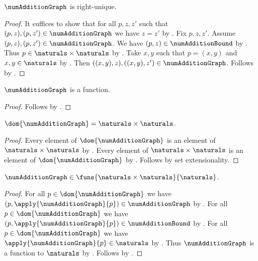 \begin{proposition}\label{num_addition_graph_rightunique}
    $\numAdditionGraph$ is right-unique.
\end{proposition}
\begin{proof}
    It suffices to show that for all $p,z,z'$ such that
        $(p,z),(p,z')\in\numAdditionGraph$ we have $z=z'$
        by .
    Fix $p,z,z'$.
    Assume $(p,z),(p,z')\in\numAdditionGraph$.
    We have $(p,z)\in\numAdditionBound$
        by .
    Thus $p\in\naturals\times\naturals$
        by .
    Take $x,y$ such that $p=(x,y)$ and $x,y\in\naturals$
        by .
    Then $((x,y),z),((x,y),z')\in\numAdditionGraph$.
    Follows by .
\end{proof}

\begin{proposition}\label{num_addition_graph_function}
    $\numAdditionGraph$ is a function.
\end{proposition}
\begin{proof}
    Follows by .
\end{proof}

\begin{proposition}\label{num_addition_graph_domain}
    $\dom{\numAdditionGraph}=\naturals\times\naturals$.
\end{proposition}
\begin{proof}
    Every element of $\dom{\numAdditionGraph}$ is an element of
        $\naturals\times\naturals$
        by .
    Every element of $\naturals\times\naturals$ is an element of
        $\dom{\numAdditionGraph}$
        by .
    Follows by set extensionality.
\end{proof}

\begin{proposition}\label{num_addition_graph_funs}
    $\numAdditionGraph\in
        \funs{\naturals\times\naturals}{\naturals}$.
\end{proposition}
\begin{proof}
    For all $p\in\dom{\numAdditionGraph}$ we have
        $(p,\apply{\numAdditionGraph}{p})\in\numAdditionGraph$
        by .
    For all $p\in\dom{\numAdditionGraph}$ we have
        $(p,\apply{\numAdditionGraph}{p})\in\numAdditionBound$
        by .
    For all $p\in\dom{\numAdditionGraph}$ we have
        $\apply{\numAdditionGraph}{p}\in\naturals$
        by .
    Thus $\numAdditionGraph$ is a function to $\naturals$
        by .
    Follows by .
\end{proof}

